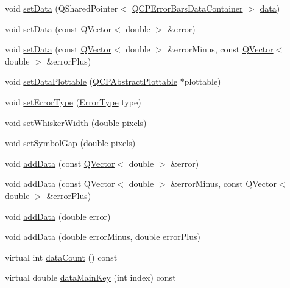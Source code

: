\begin{DoxyCompactItemize}
\item 
void \hyperlink{class_q_c_p_error_bars_a92b1980003255f5f7c05407a4d92aabc}{set\+Data} (Q\+Shared\+Pointer$<$ \hyperlink{class_q_vector}{Q\+C\+P\+Error\+Bars\+Data\+Container} $>$ \hyperlink{class_q_c_p_error_bars_ade69711ef3f9ec10e77d121fa2ba773b}{data})
\item 
void \hyperlink{class_q_c_p_error_bars_a2f33d68a7ec163b09017dce3d9d3abcc}{set\+Data} (const \hyperlink{class_q_vector}{Q\+Vector}$<$ double $>$ \&error)
\item 
void \hyperlink{class_q_c_p_error_bars_aac0cf070b957c11177e91b02bcb433c8}{set\+Data} (const \hyperlink{class_q_vector}{Q\+Vector}$<$ double $>$ \&error\+Minus, const \hyperlink{class_q_vector}{Q\+Vector}$<$ double $>$ \&error\+Plus)
\item 
void \hyperlink{class_q_c_p_error_bars_aabb42a964cfbf780cd1c79850c7cd989}{set\+Data\+Plottable} (\hyperlink{class_q_c_p_abstract_plottable}{Q\+C\+P\+Abstract\+Plottable} $\ast$plottable)
\item 
void \hyperlink{class_q_c_p_error_bars_af0af493d454a8f3a0908830160680d2b}{set\+Error\+Type} (\hyperlink{class_q_c_p_error_bars_a95f0220f11a72648b96480a85ce26474}{Error\+Type} type)
\item 
void \hyperlink{class_q_c_p_error_bars_ad05f6ff9e46c6047f1cd2459744b7b59}{set\+Whisker\+Width} (double pixels)
\item 
void \hyperlink{class_q_c_p_error_bars_a280ee8d863d8a2630c309701d019b3de}{set\+Symbol\+Gap} (double pixels)
\item 
void \hyperlink{class_q_c_p_error_bars_aae296ad9817b3fa418db284af81cecf8}{add\+Data} (const \hyperlink{class_q_vector}{Q\+Vector}$<$ double $>$ \&error)
\item 
void \hyperlink{class_q_c_p_error_bars_a2135cf41d7925a3dcdadd4eb03fd3eb6}{add\+Data} (const \hyperlink{class_q_vector}{Q\+Vector}$<$ double $>$ \&error\+Minus, const \hyperlink{class_q_vector}{Q\+Vector}$<$ double $>$ \&error\+Plus)
\item 
void \hyperlink{class_q_c_p_error_bars_a39ef73b0e61941fc4064fd3a5224c72a}{add\+Data} (double error)
\item 
void \hyperlink{class_q_c_p_error_bars_a1833c5de9c2fe2952b977505d9f27cd1}{add\+Data} (double error\+Minus, double error\+Plus)
\item 
virtual int \hyperlink{class_q_c_p_error_bars_aafb9bdb1915a6516c5ac087c4cf3fa31}{data\+Count} () const 
\item 
virtual double \hyperlink{class_q_c_p_error_bars_a11214dc4cb036c4aa72c5be3ad1c8c4d}{data\+Main\+Key} (int index) const 

\end{DoxyCompactItemize}
